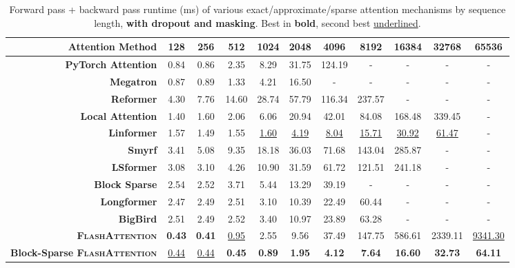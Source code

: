 \documentclass{article}
\newcommand{\sysname}{\textsc{FlashAttention}\xspace}
\begin{document}
\begin{table}
\centering
\scriptsize
\captionsetup{font=small}
\caption{Forward pass + backward pass runtime (ms) of various exact/approximate/sparse attention mechanisms by sequence length, \textbf{with dropout and masking}. Best in \textbf{bold}, second best \underline{underlined}.}
\begin{tabular}{@{}r|cccccccccc@{}}
\toprule
\textbf{Attention Method} & 128 & 256 & 512 & 1024 & 2048 & 4096 & 8192 & 16384 & 32768 & 65536 \\
\hline
\textbf{PyTorch Attention} & 0.84 & 0.86 & 2.35 & 8.29 & 31.75 & 124.19 & - & - & - & - \\
\textbf{Megatron} & 0.87 & 0.89 & 1.33 & 4.21 & 16.50 & - & - & - & - & - \\
\hline
\textbf{Reformer} & 4.30 & 7.76 & 14.60 & 28.74 & 57.79 & 116.34 & 237.57 & - & - & - \\
\textbf{Local Attention} & 1.40 & 1.60 & 2.06 & 6.06 & 20.94 & 42.01 & 84.08 & 168.48 & 339.45 & - \\
\textbf{Linformer} & 1.57 & 1.49 & 1.55 & \underline{1.60} & \underline{4.19} & \underline{8.04} & \underline{15.71} & \underline{30.92} & \underline{61.47} & - \\
\textbf{Smyrf} & 3.41 & 5.08 & 9.35 & 18.18 & 36.03 & 71.68 & 143.04 & 285.87 & - & - \\
\textbf{LSformer} & 3.08 & 3.10 & 4.26 & 10.90 & 31.59 & 61.72 & 121.51 & 241.18 & - & - \\
\hline
\textbf{Block Sparse} & 2.54 & 2.52 & 3.71 & 5.44 & 13.29 & 39.19 & - & - & - & - \\
\textbf{Longformer} & 2.47 & 2.49 & 2.51 & 3.10 & 10.39 & 22.49 & 60.44 & - & - & - \\
\textbf{BigBird} & 2.51 & 2.49 & 2.52 & 3.40 & 10.97 & 23.89 & 63.28 & - & - & - \\
\hline
\textbf{\sysname} & \textbf{0.43} & \textbf{0.41} & \underline{0.95} & 2.55 & 9.56 & 37.49 & 147.75 & 586.61 & 2339.11 & \underline{9341.30} \\
\textbf{Block-Sparse \sysname} & \underline{0.44} & \underline{0.44} & \textbf{0.45} & \textbf{0.89} & \textbf{1.95} & \textbf{4.12} & \textbf{7.64} & \textbf{16.60} & \textbf{32.73} & \textbf{64.11} \\
\bottomrule
\end{tabular}
\label{tab:dropout_masking_combined}
\end{table}
\end{document}
